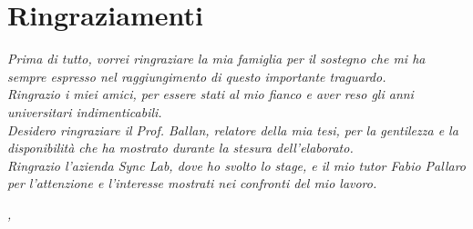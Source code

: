 
\cleardoublepage
{}
{}




\begingroup
\let\clearpage\relax
\let\cleardoublepage\relax
\let\cleardoublepage\relax

\chapter*{Ringraziamenti}



\noindent \textit{Prima di tutto, vorrei ringraziare la mia famiglia per il sostegno che mi ha sempre espresso nel raggiungimento di questo importante traguardo.}\\

\noindent \textit{Ringrazio i miei amici, per essere stati al mio fianco e aver reso gli anni universitari indimenticabili.}\\

\noindent \textit{Desidero ringraziare il Prof. Ballan, relatore della mia tesi, per la gentilezza e la disponibilità che ha mostrato durante la stesura dell'elaborato.}\\

\noindent \textit{Ringrazio l'azienda Sync Lab, dove ho svolto lo stage, e il mio tutor Fabio Pallaro per l'attenzione e l'interesse mostrati nei confronti del mio lavoro.}\\


\bigskip

\noindent\textit{\myLocation, \myTime}
\hfill \myName

\endgroup

